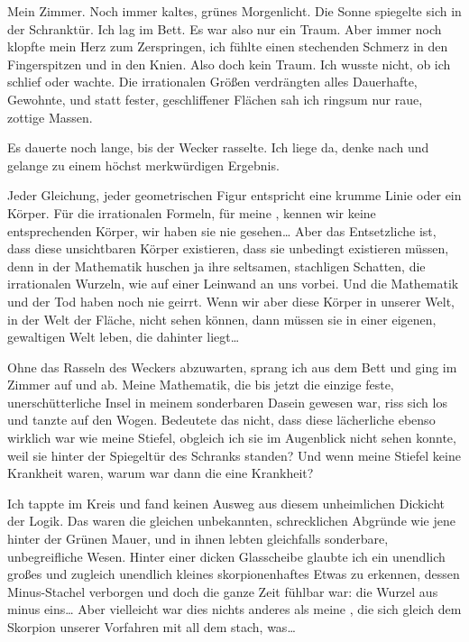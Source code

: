 Mein Zimmer. Noch immer kaltes, grünes Morgenlicht. Die Sonne
spiegelte sich in der Schranktür. Ich lag im Bett. Es war also nur
ein Traum. Aber immer noch klopfte mein Herz zum Zerspringen, ich
fühlte einen stechenden Schmerz in den Fingerspitzen und in den
Knien. Also doch kein Traum. Ich wusste nicht, ob ich schlief oder
wachte. Die irrationalen Größen verdrängten alles Dauerhafte,
Gewohnte, und statt fester, geschliffener Flächen sah ich ringsum
nur raue, zottige Massen.

Es dauerte noch lange, bis der Wecker
rasselte. Ich liege da, denke nach und gelange zu einem höchst
merkwürdigen Ergebnis.

Jeder Gleichung, jeder geometrischen Figur entspricht eine krumme
Linie oder ein Körper. Für die irrationalen Formeln, für meine \wurzel{},
kennen wir keine entsprechenden Körper, wir haben sie nie
gesehen\ldots{} Aber das Entsetzliche ist, dass diese unsichtbaren
Körper existieren, dass sie unbedingt existieren müssen, denn in
der Mathematik huschen ja ihre seltsamen, stachligen Schatten, die
irrationalen Wurzeln, wie auf einer Leinwand an uns vorbei. Und die
Mathematik und der Tod haben noch nie geirrt. Wenn wir aber diese
Körper in unserer Welt, in der Welt der Fläche, nicht sehen können,
dann müssen sie in einer eigenen, gewaltigen Welt leben, die
dahinter liegt\ldots{}

Ohne das Rasseln des Weckers abzuwarten, sprang ich aus dem Bett
und ging im Zimmer auf und ab. Meine Mathematik, die bis jetzt die
einzige feste, unerschütterliche Insel in meinem sonderbaren Dasein
gewesen war, riss sich los und tanzte auf den Wogen. Bedeutete das
nicht, dass diese lächerliche  ebenso wirklich war wie meine
Stiefel, obgleich ich sie im Augenblick nicht sehen konnte, weil
sie hinter der Spiegeltür des Schranks standen? Und wenn meine
Stiefel keine Krankheit waren, warum war dann die  eine
Krankheit?

Ich tappte im Kreis und fand keinen Ausweg aus diesem unheimlichen
Dickicht der Logik. Das waren die gleichen unbekannten,
schrecklichen Abgründe wie jene hinter der Grünen Mauer, und in
ihnen lebten gleichfalls sonderbare, unbegreifliche Wesen. Hinter
einer dicken Glasscheibe glaubte ich ein unendlich großes und
zugleich unendlich kleines skorpionenhaftes Etwas zu erkennen,
dessen Minus-Stachel verborgen und doch die ganze Zeit fühlbar war:
die Wurzel aus minus eins\ldots{} Aber vielleicht war dies nichts
anderes als meine , die sich gleich dem Skorpion unserer
Vorfahren mit all dem stach, was\ldots{}

